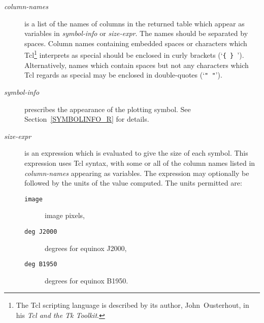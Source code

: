 \documentclass[twoside,11pt]{article}
\renewcommand{\_}{\texttt{\symbol{95}}}
\begin{document}
\begin{description}

  \item[{\it column-names}] is a list of the names of columns in the
   returned table which appear as variables in {\it symbol-info}\/ or
   {\it size-expr}.  The names should be separated by spaces.  Column
   names containing embedded spaces or characters which Tcl\footnote{The
   Tcl scripting language is described by its author, John~Ousterhout, in
   his {\it Tcl and the Tk Toolkit}\/\cite{OUSTERHOUT94}.} interprets as
   special should be enclosed in curly brackets (`{\tt \{ \} }').
   Alternatively, names which contain spaces but not any characters
   which Tcl regards as special may be enclosed in double-quotes
   (`{\tt " "}').

  \item[{\it symbol-info}] prescribes the appearance of the plotting
   symbol.  See Section~\ref{SYMBOLINFO_R} for details.

  \item[{\it size-expr}] is an expression which is evaluated to give the
   size of each symbol.  This expression uses Tcl syntax, with some or
   all of the column names listed in {\it column-names}\/ appearing as
   variables.  The expression may optionally be followed by the units
   of the value computed.  The units permitted are:

  \begin{description}

    \item[{\tt image}] image pixels,

    \item[{\tt deg J2000}] degrees for equinox J2000,

    \item[{\tt deg B1950}] degrees for equinox B1950.

  \end{description}

\end{description}
\end{document}
